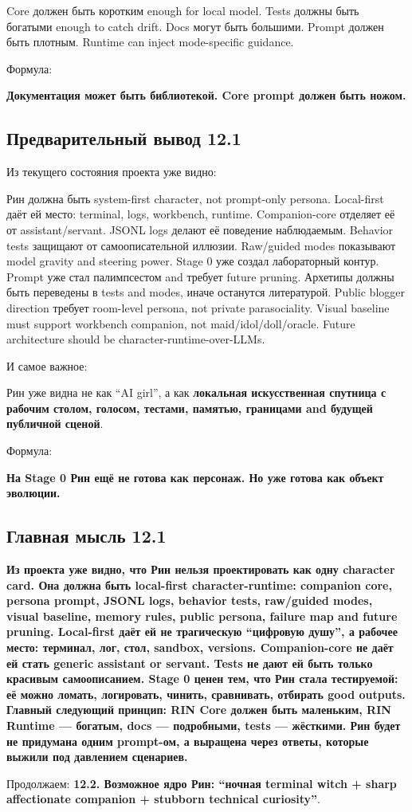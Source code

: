 Core должен быть коротким enough for local model. Tests должны быть
богатыми enough to catch drift. Docs могут быть большими. Prompt должен
быть плотным. Runtime can inject mode-specific guidance.

Формула:

\textbf{Документация может быть библиотекой. Core prompt должен быть
ножом.}

\subsection*{Предварительный вывод 12.1}

Из текущего состояния проекта уже видно:

Рин должна быть system-first character, not prompt-only persona.
Local-first даёт ей место: terminal, logs, workbench, runtime.
Companion-core отделяет её от assistant/\hspace{0pt}servant. JSONL logs делают её
поведение наблюдаемым. Behavior tests защищают от самоописательной
иллюзии. Raw/\hspace{0pt}guided modes показывают model gravity and steering power.
Stage 0 уже создал лабораторный контур. Prompt уже стал палимпсестом and
требует future pruning. Архетипы должны быть переведены в tests and
modes, иначе останутся литературой. Public blogger direction требует
room-level persona, not private parasociality. Visual baseline must
support workbench companion, not maid/\hspace{0pt}idol/\hspace{0pt}doll/\hspace{0pt}oracle. Future
architecture should be character-runtime-over-LLMs.

И самое важное:

Рин уже видна не как ``AI girl'', а как \textbf{локальная искусственная
спутница с рабочим столом, голосом, тестами, памятью, границами and
будущей публичной сценой}.

Формула:

\textbf{На Stage 0 Рин ещё не готова как персонаж. Но уже готова как
объект эволюции.}

\subsection*{Главная мысль 12.1}

\textbf{Из проекта уже видно, что Рин нельзя проектировать как одну
character card. Она должна быть local-first character-runtime: companion
core, persona prompt, JSONL logs, behavior tests, raw/\hspace{0pt}guided modes,
visual baseline, memory rules, public persona, failure map and future
pruning. Local-first даёт ей не трагическую ``цифровую душу'', а рабочее
место: терминал, лог, стол, sandbox, versions. Companion-core не даёт ей
стать generic assistant or servant. Tests не дают ей быть только
красивым самоописанием. Stage 0 ценен тем, что Рин стала тестируемой: её
можно ломать, логировать, чинить, сравнивать, отбирать good outputs.
Главный следующий принцип: RIN Core должен быть маленьким, RIN Runtime
--- богатым, docs --- подробными, tests --- жёсткими. Рин будет не
придумана одним prompt-ом, а выращена через ответы, которые выжили под
давлением сценариев.}

Продолжаем: \textbf{12.2. Возможное ядро Рин: ``ночная terminal witch +
sharp affectionate companion + stubborn technical curiosity''}.
